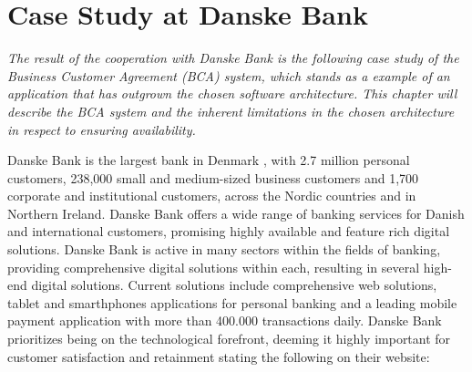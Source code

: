 \chapter{Case Study at Danske Bank}
\textit{The result of the cooperation with Danske Bank is the following case study of the Business Customer Agreement (BCA) system, which stands as a example of an application that has outgrown the chosen software architecture. This chapter will describe the BCA system and the inherent limitations in the chosen architecture in respect to ensuring availability.}

Danske Bank is the largest bank in Denmark \cite[p.~38]{danske_bank_setting_up_in_denmark}, with 2.7 million personal customers, 238,000 small and medium-sized business customers and 1,700 corporate and institutional customers, across the Nordic countries and in Northern Ireland. Danske Bank offers a wide range of banking services for Danish and international customers, promising highly available and feature rich digital solutions. Danske Bank is active in many sectors within the fields of banking, providing comprehensive digital solutions within each, resulting in several high-end digital solutions. Current solutions include comprehensive web solutions, tablet and smarthphones applications for personal banking and a leading mobile payment application with more than 400.000 transactions daily. Danske Bank prioritizes being on the technological forefront, deeming it highly important for customer satisfaction and retainment stating the following on their website\cite{danske_bank_our_essence}:



